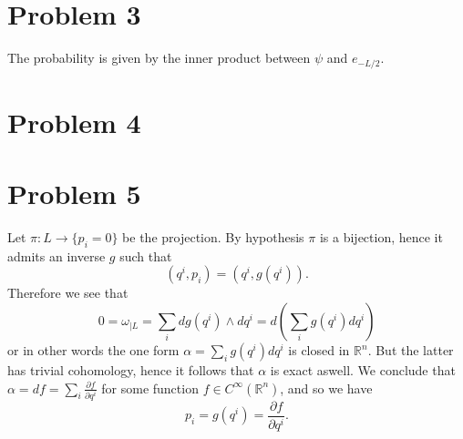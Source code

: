 \documentclass[]{article}
\newcommand{\D}[2]{\frac{\partial #1}{\partial #2}}
\begin{document}
\section{Problem 3}

The probability is given by the inner product between $\psi$ and $e_{-L/2}$.



\section{Problem 4}



\section{Problem 5}

Let $\pi:L\to \{p_i=0\}$ be the projection. By hypothesis $\pi$ is a bijection, hence it admits an inverse $g$ such that 
$$ (q^i,p_i) = (q^i,g(q^i)). $$ 
Therefore we see that $$ 0=\omega_{|L} = \sum_i dg(q^i)\wedge dq^i = d(\sum_i g(q^i)dq^i) $$ or in other words the one form $\alpha = \sum_i g(q^i)dq^i $ is closed in $\mathbb{R}^n$. But the latter has trivial cohomology, hence it follows that $\alpha$ is exact aswell. We conclude that $ \alpha = df =\sum_i \D{f}{q^i} $ for some function $f \in C^{\infty}(\mathbb{R}^n)$, and so we have $$ p_i = g(q^i) = \D{f}{q^i}. $$
\end{document}
